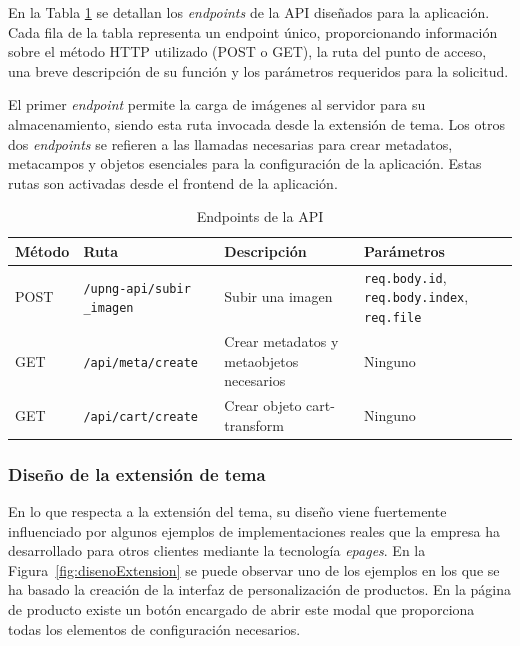 \documentclass[12pt]{article}
\begin{document}
En la Tabla \ref{tab:endpoints} se detallan los \textit{endpoints} de la API diseñados para la aplicación. 
Cada fila de la tabla representa un endpoint único, proporcionando información sobre el método HTTP 
utilizado (POST o GET), la ruta del punto de acceso, una breve descripción de su función y los parámetros 
requeridos para la solicitud.

El primer \textit{endpoint} permite la carga de imágenes al servidor para su almacenamiento, siendo esta ruta invocada 
desde la extensión de tema. Los otros dos \textit{endpoints} se refieren a las llamadas necesarias para crear metadatos, 
metacampos y objetos esenciales para la configuración de la aplicación. Estas rutas son activadas desde el frontend de la aplicación.

\begin{table}[h!]
    \centering
    \begin{tabularx}{\textwidth}{|X|X|X|X|}
        \hline
        \textbf{Método} & \textbf{Ruta} & \textbf{Descripción} & \textbf{Parámetros} \\
        \hline
        POST & \texttt{/upng-api/subir
        \_imagen} & Subir una imagen & 
        \texttt{req.body.id}, \texttt{req.body.index}, \texttt{req.file} \\
        \hline
        GET & \texttt{/api/meta/create} & Crear metadatos y metaobjetos necesarios & Ninguno \\
        \hline
        GET & \texttt{/api/cart/create} & Crear objeto 
        cart-transform & Ninguno \\
        \hline
    \end{tabularx}
    \caption{Endpoints de la API}
    \label{tab:endpoints}
\end{table}

\subsubsection{Diseño de la extensión de tema}
En lo que respecta a la extensión del tema, su diseño viene fuertemente influenciado por algunos ejemplos de implementaciones reales que la empresa ha desarrollado para otros clientes 
mediante la tecnología \textit{epages}. En la Figura~\ref{fig:disenoExtension} se puede observar uno de los ejemplos en los que se ha basado la creación de la interfaz
de personalización de productos. En la página de producto existe un botón encargado de abrir este modal que proporciona todas los elementos de configuración necesarios.
\end{document}

